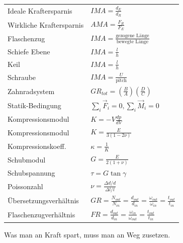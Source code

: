 \documentclass[12pt,a4paper]{article}
\renewcommand{\d}[2]{\frac{d #1}{d #2}}
\renewcommand{\=}[1]{\stackrel{#1}{=}}
\theoremstyle{definition}
\theoremstyle{remark}
\begin{document}
\begin{center}
\begin{minipage}[t]{.55\linewidth}
\begin{tabular}{ll}
Ideale Kraftersparnis & $IMA = \frac{d_E}{d_R}$\\
Wirkliche Kraftersparnis & $AMA = \frac{F_R}{F_E}$\\
Flaschenzug & $IMA = \frac{\text{gezogene Länge}}{\text{bewegte Länge}}$\\
Schiefe Ebene & $IMA = \frac{l}{h}$\\
Keil & $IMA = \frac{l}{h}$\\
Schraube & $IMA = \frac{U}{\text{pitch}}$\\
Zahnradsystem & $GR_{tot} = (\frac{B}{A})(\frac{D}{C})$\\
Statik-Bedingung & $\sum_i \vec{F}_i = 0, \sum_i \vec{M}_i = 0$\\
Kompressionsmodul & $K = -V \d{p}{V}$\\
Kompressionsmodul & $K = \frac{E}{3(1-2 \nu)}$\\
Kompressionskoeff. & $\kappa = \frac{1}{K}$\\
Schubmodul & $G = \frac{E}{2(1+\nu)}$\\
Schubspannung & $\tau = G \tan \gamma$\\
Poissonzahl & $\nu = \frac{\Delta d /d}{\Delta l / l}$\\
Übersetzungsverhältnis & $GR = \frac{N_{out}}{N_{in}} = \frac{d_{out}}{d_{in}} = \frac{\omega_{out}}{\omega_{in}} = \frac{t_{out}}{t_{in}}$\\
Flaschenzugverhältnis & $FR = \frac{d_{out}}{d_{in}} = \frac{\omega_{in}}{\omega_{out}} = \frac{t_{out}}{t_{in}}$
\end{tabular}
\end{minipage}%
\begin{minipage}[t]{.45\linewidth}
\vspace{0pt}

\begin{framed}
\centering Was man an Kraft spart, muss man an Weg zusetzen.
\end{framed}


\end{minipage}
\end{center}
\end{document}
